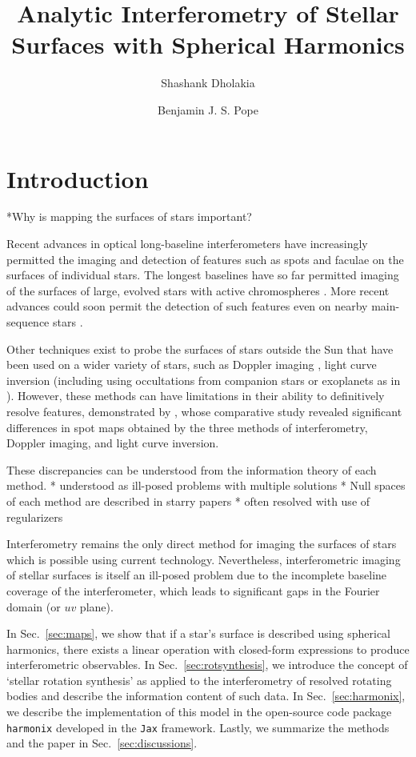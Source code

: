 \documentclass[modern]{aastex631}
\begin{document}
\title{Analytic Interferometry of Stellar Surfaces with Spherical Harmonics}

\author{Shashank Dholakia} \author{Benjamin J. S. Pope}

\begin{abstract}
\end{abstract}

\section{Introduction}
\label{sec:intro}
*Why is mapping the surfaces of stars important?

Recent advances in optical long-baseline interferometers have increasingly permitted the imaging and detection of features such as spots and faculae on the surfaces of individual stars. The longest baselines have so far permitted imaging of the surfaces of large, evolved stars with active chromospheres \citep{roettenbacher2016, martinez2021}. More recent advances could soon permit the detection of such features even on nearby main-sequence stars \citep{mourard2018, roettenbacher2022}.

Other techniques exist to probe the surfaces of stars outside the Sun that have been used on a wider variety of stars, such as Doppler imaging \citep{vogt1987}, light curve inversion \citep{harmon2000} (including using occultations from companion stars or exoplanets as in \citet{morris2017}). However, these methods can have limitations in their ability to definitively resolve features, demonstrated by \cite{roettenbacher2017}, whose comparative study revealed significant differences in spot maps obtained by the three methods of interferometry, Doppler imaging, and light curve inversion. 

These discrepancies can be understood from the information theory of each method. * understood as ill-posed problems with multiple solutions * Null spaces of each method are described in starry papers * often resolved with use of regularizers

Interferometry remains the only direct method for imaging the surfaces of stars which is possible using current technology. Nevertheless, interferometric imaging of stellar surfaces is itself an ill-posed problem due to the incomplete baseline coverage of the interferometer, which leads to significant gaps in the Fourier domain (or $uv$ plane). 

In Sec.~\ref{sec:maps}, we show that if a star's surface is described using spherical harmonics, there exists a linear operation with closed-form expressions to produce interferometric observables. In Sec.~\ref{sec:rotsynthesis}, we introduce the concept of `stellar rotation synthesis' as applied to the interferometry of resolved rotating bodies and describe the information content of such data. In  Sec.~\ref{sec:harmonix}, we describe the implementation of this model in the open-source code package \texttt{harmonix} developed in the \texttt{Jax} framework. Lastly, we summarize the methods and the paper in Sec.~\ref{sec:discussions}.
\end{document}
